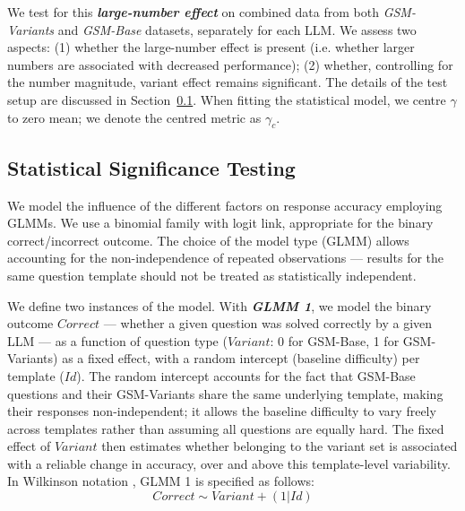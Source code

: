 \documentclass[11pt]{article}
\begin{document}
We test for this \textbf{\textit{large-number effect}} on combined data from both \textit{GSM-Variants} and \textit{GSM-Base} datasets, separately for each LLM. We assess two aspects: (1) whether the large-number effect is present (i.e. whether larger numbers are associated with decreased performance); (2) whether, controlling for the number magnitude, variant effect remains significant. The details of the test setup are discussed in Section~\ref{sec:glmm}. When fitting the statistical model, we centre $\gamma$ to zero mean; we denote the centred metric as $\gamma_c$.

\subsection{Statistical Significance Testing}\label{sec:glmm}
We model the influence of the different factors on response accuracy employing GLMMs. We use a binomial family with logit link, appropriate for the binary correct/incorrect outcome. 
The choice of the model type (GLMM) allows accounting for the non-independence of repeated observations --- results for the same question template should not be treated as statistically independent.

We define two instances of the model. With \textbf{\textit{GLMM 1}}, we model the binary outcome $Correct$ --- whether a given question was solved correctly by a given LLM --- as a function of question type ($Variant$: 0 for GSM-Base, 1 for GSM-Variants) as a fixed effect, with a random intercept (baseline difficulty) per template ($Id$). The random intercept accounts for the fact that GSM-Base questions and their GSM-Variants share the same underlying template, making their responses non-independent; it allows the baseline difficulty to vary freely across templates rather than assuming all questions are equally hard. The fixed effect of $Variant$ then estimates whether belonging to the variant set is associated with a reliable change in accuracy, over and above this template-level variability.
In Wilkinson notation \cite{wilkinson1973symbolic, Bates2015lme4}, GLMM 1 is specified as follows:
%
\begin{equation}
    Correct \sim Variant + (1 | Id)
\end{equation}
%
\end{document}
